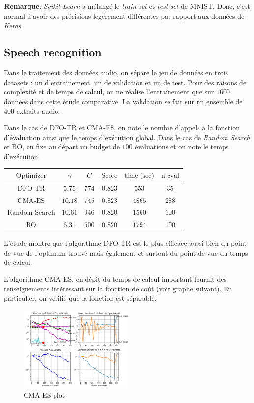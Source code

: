 \documentclass[12 pt, a4paper]{article}
\begin{document}
\textbf{Remarque}: \textit{Scikit-Learn} a mélangé le \emph{train set} et \emph{test set} de MNIST. Donc, c'est normal d'avoir des précisions légèrement différentes par rapport aux données de \textit{Keras}.

\subsection*{Speech recognition}

Dans le traitement des données audio, on sépare le jeu de données en trois datasets : un d'entraînement, un de validation et un de test. Pour des raisons de complexité et de temps de calcul, on ne réalise l'entraînement que sur $1600$ données dans cette étude comparative. La validation se fait sur un ensemble de $400$ extraits audio.

Dans le cas de DFO-TR et CMA-ES, on note le nombre d'appels à la fonction d'évaluation ainsi que le temps d'exécution global. Dans le cas de \textit{Random Search} et BO, on fixe au départ un budget de $100$ évaluations et on note le temps d'exécution.

\begin{center}
\begin{tabular}{|c|c|c|c|c|c|}
  \hline
  $\text{Optimizer}$ & $\gamma$ & $C$ & $\text{Score}$ & $\text{time (sec)}$ & $\text{n eval}$ \\
  \hline
  $\text{DFO-TR}$ & $5.75$ & $774$ & $0.823$ & $553$ & $35$ \\
  $\text{CMA-ES}$ & $10.18$ & $745$ & $0.823$ & $4865$ & $288$\\
  $\text{Random Search}$ & $10.61$ & $946$ & $0.820$ & $1560$ & $100$\\
  $\text{BO}$ & $6.31$ & $500$ & $0.820$ & $1794$ & $100$\\
  \hline
\end{tabular}
\end{center}

L'étude montre que l'algorithme DFO-TR est le plus efficace aussi bien du point de vue de l'optimum trouvé mais également et surtout du point de vue du temps de calcul.

L'algorithme CMA-ES, en dépit du temps de calcul important fournit des renseignements intéressant sur la fonction de coût (voir graphe suivant). En particulier, on vérifie que la fonction est séparable.

\begin{figure}[h]
\centering
\includegraphics[width = 0.5\textwidth]{CMA_plot.png}
\caption{CMA-ES plot}
\label{fig:step}
\end{figure}

\quad



\end{document}

